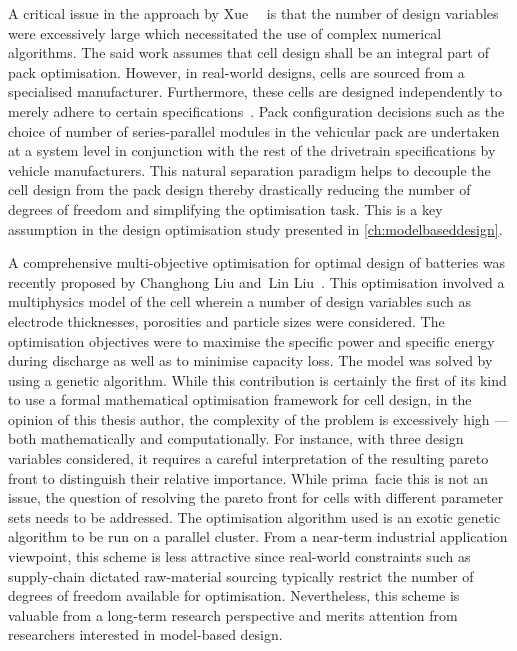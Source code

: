 
A critical issue in the approach  by Xue~\etal~\cite{Xue2014} is that the number
of design variables were excessively large which necessitated the use of complex
numerical  algorithms. The  said  work  assumes that  cell  design  shall be  an
integral part  of pack optimisation.  However, in real-world designs,  cells are
sourced from a  specialised manufacturer. Furthermore, these  cells are designed
independently to merely  adhere to certain specifications~\cite{Maksimovic2012}.
Pack configuration  decisions such  as the choice  of number  of series-parallel
modules in  the vehicular pack are  undertaken at a system  level in conjunction
with the  rest of the  drivetrain specifications by vehicle  manufacturers. This
natural separation  paradigm helps  to decouple  the cell  design from  the pack
design  thereby  drastically reducing  the  number  of  degrees of  freedom  and
simplifying  the optimisation  task.  This is  a key  assumption  in the  design
optimisation study presented in \cref{ch:modelbaseddesign}.

A  comprehensive multi-objective  optimisation for  optimal design  of batteries
was  recently  proposed  by  Changhong  Liu  and~Lin  Liu~\cite{Liu2017b}.  This
optimisation  involved a  multiphysics model  of the  cell wherein  a number  of
design variables  such as electrode  thicknesses, porosities and  particle sizes
were considered. The optimisation objectives were to maximise the specific power
and specific energy  during discharge as well as to  minimise capacity loss. The
model  was solved  by  using a  genetic algorithm.  While  this contribution  is
certainly  the first  of  its kind  to use  a  formal mathematical  optimisation
framework for cell design, in the  opinion of this thesis author, the complexity
of the problem is excessively  high --- both mathematically and computationally.
For  instance, with  three design  variables considered,  it requires  a careful
interpretation  of the  resulting  pareto front  to  distinguish their  relative
importance. While  prima~facie this is not  an issue, the question  of resolving
the pareto front for cells with  different parameter sets needs to be addressed.
The optimisation algorithm  used is an exotic  genetic algorithm to be  run on a
parallel cluster. From a near-term industrial application viewpoint, this scheme
is less  attractive since real-world  constraints such as  supply-chain dictated
raw-material  sourcing  typically restrict  the  number  of degrees  of  freedom
available  for  optimisation.  Nevertheless,  this scheme  is  valuable  from  a
long-term research perspective and  merits attention from researchers interested
in model-based design.

